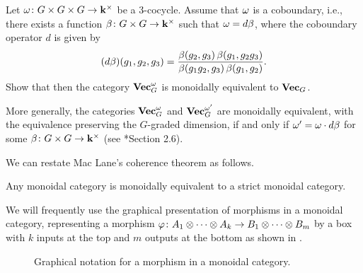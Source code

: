 \begin{exercise}\label{ec:twisted-group-cat}
  Let $\omega\colon G\times G\times G\to \mathbf{k}^\times$ be a 3-cocycle. Assume that
  $\omega$ is a coboundary, i.e., there exists a function $\beta\colon G\times
  G\to \mathbf{k}^\times$ such that $\omega=d\beta$, where the coboundary operator $d$
  is given by
  $$
    (d\beta)(g_1, g_2, g_3)=
    \frac{\beta(g_2, g_3)\,\beta(g_1, g_2g_3)}{\beta(g_1g_2, g_3)\,\beta(g_1, g_2)}.
  $$
  Show that then the category $\mathbf{Vec}_G^\omega$ is monoidally equivalent to
  $\mathbf{Vec}_G$.

  More generally, the categories $\mathbf{Vec}_G^\omega$ and $\mathbf{Vec}_G^{\omega'}$ are
  monoidally equivalent, with the equivalence preserving the $G$-graded
  dimension, if and only if $\omega'=\omega \cdot d\beta$ for some
  $\beta\colon G\times G\to \mathbf{k}^\times$ (see *{Section
  2.6}).
\end{exercise}



We can restate Mac Lane's coherence theorem as follows.
\begin{theorem}\label{t:strictify}
  Any monoidal category is monoidally equivalent to a strict monoidal category.
\end{theorem}




\begin{convention}\label{c:graphical-monoidal}
  We will frequently use the graphical presentation of morphisms
  in a monoidal category, representing a morphism
  $\varphi \colon A_1\otimes \dots \otimes A_k\to B_1\otimes\dots \otimes B_m$
  by a box with $k$ inputs at the top and $m$ outputs at the bottom as shown in
  .
\begin{figure}[h]
  \centering
  \caption{Graphical notation for a morphism in a monoidal category.}
  \label{f:graphical-morphism}
\end{figure}
\end{convention}







